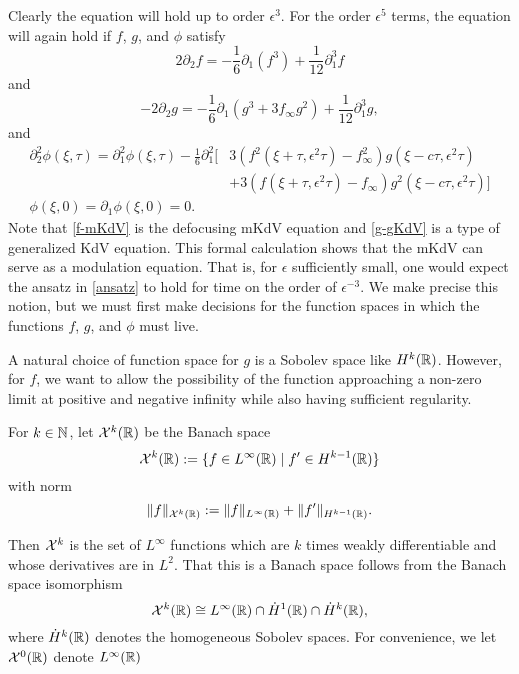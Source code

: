 Clearly the equation will hold up to order \(\epsilon^3\). For the order \(\epsilon^5\) terms, the equation will again hold if \(f\), \(g\), and \(\phi\) satisfy
\begin{equation}\label{f-mKdV}
	2 \partial_2 f = - \frac 1 6 \partial_1(f^3) + \frac 1 {12} \partial_1^3 f
\end{equation}
and 
\begin{equation}\label{g-gKdV}
	-2 \partial_2 g = - \frac 1 6 \partial_1 (g^3 + 3f_\infty g^2) + \frac 1 {12}\partial_1^3 g,
\end{equation}
and
\begin{equation}\label{phi-pde}
	\begin{aligned}
		\partial_2^2 \phi(\xi, \tau) = \partial_1^2\phi(\xi, \tau)- \frac 1 6 \partial_1^2 \big[& 3(f^2(\xi+\tau,\epsilon^2\tau)-f_\infty^2)g(\xi-c\tau,\epsilon^2\tau) \\&+ 3 (f(\xi+\tau,\epsilon^2\tau)-f_\infty)g^2(\xi-c\tau,\epsilon^2\tau) \big ] \\
		\phi(\xi,0) = \partial_1 \phi(\xi, 0) = 0.
	\end{aligned}
\end{equation}
Note that \cref{f-mKdV} is the defocusing mKdV equation and \cref{g-gKdV} is a type of generalized KdV equation. This formal calculation shows that the mKdV can serve as a modulation equation. That is, for \(\epsilon\) sufficiently small, one would expect the ansatz in \cref{ansatz} to hold for time on the order of \(\epsilon^{-3}\). We make precise this notion, but we must first make decisions for the function spaces in which the functions \(f\), \(g\), and \(\phi\) must live.

A natural choice of function space for \(g\) is a Sobolev space like \(H^k(\mathbb{R})\). However, for \(f\), we want to allow the possibility of the function approaching a non-zero limit at positive and negative infinity while also having sufficient regularity. 
\begin{defn}
	For \(k\in\mathbb{N}\), let \(\mathcal{X}^k(\mathbb{R})\) be the Banach space 
	\begin{equation*}
		\mathcal{X}^k(\mathbb{R}) := \{f \in L^\infty(\mathbb{R}) \mid f'\in H^{k-1}(\mathbb{R})\}
	\end{equation*}
	with norm
	\begin{equation*}
		\| f \|_{\mathcal{X}^k(\mathbb{R})} := \| f \|_{L^\infty(\mathbb{R})} + \| f' \|_{H^{k-1}(\mathbb{R})}.
	\end{equation*}
\end{defn}
Then \(\mathcal{X}^k\) is the set of \(L^\infty\) functions which are \(k\) times weakly differentiable and whose derivatives are in \(L^2\). That this is a Banach space follows from the Banach space isomorphism
\begin{equation*}
	\mathcal{X}^k(\mathbb{R}) \cong L^\infty(\mathbb{R}) \cap \dot H^1(\mathbb{R}) \cap \dot H^k(\mathbb{R}),
\end{equation*}
where \(\dot H^k(\mathbb{R})\) denotes the homogeneous Sobolev spaces. For convenience, we let \(\mathcal{X}^0(\mathbb{R})\) denote \(L^\infty(\mathbb{R})\)

